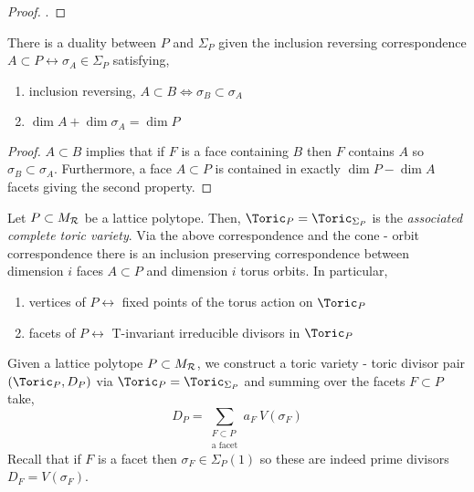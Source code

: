 \begin{proof}
\cite[Thm. 2.3.2]{cox}.
\end{proof}

\begin{proposition}
There is a duality between $P$ and $\Sigma_P$ given the inclusion reversing correspondence $A \subset P \leftrightarrow \sigma_A \in \Sigma_P$ satisfying,
\begin{enumerate}
\item inclusion reversing, $A \subset B \iff \sigma_B \subset \sigma_A$
\item $\dim{A} + \dim{\sigma_A} = \dim{P}$
\end{enumerate}
\end{proposition}

\begin{proof}
$A \subset B$ implies that if $F$ is a face containing $B$ then $F$ contains $A$ so $\sigma_B \subset \sigma_A$. Furthermore, a face $A \subset P$ is contained in exactly $\dim{P} - \dim{A}$ facets giving the second property. 
\end{proof}

\begin{definition}
Let $P \subset M_{\mathcal{R}}$ be a lattice polytope. Then, $\Toric_P = \Toric_{\Sigma_P}$ is the \textit{associated complete toric variety}. Via the above correspondence and the cone - orbit correspondence there is an inclusion preserving correspondence between dimension $i$ faces $A \subset P$ and dimension $i$ torus orbits. In particular,
\begin{enumerate}
\item vertices of $P \leftrightarrow$ fixed points of the torus action on $\Toric_P$
\item facets of $P \leftrightarrow$ T-invariant irreducible divisors in $\Toric_P$
\end{enumerate}
\end{definition}

\begin{definition}
Given a lattice polytope $P \subset M_{\mathcal{R}}$, we construct a toric variety - toric divisor pair $(\Toric_P, D_P)$ via $\Toric_P = \Toric_{\Sigma_P}$ and summing over the facets $F \subset P$ take,
\[ D_P = \sum_{\substack{F \subset P \\ \text{a facet}}} a_F \: V(\sigma_F) \]
Recall that if $F$ is a facet then $\sigma_F \in \Sigma_P(1)$ so these are indeed prime divisors $D_F = V(\sigma_F)$.
\end{definition}



